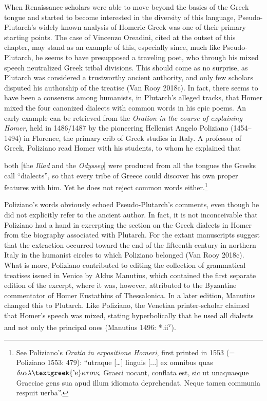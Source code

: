 \begin{styleStandard}
When Renaissance scholars were able to move beyond the basics of the Greek tongue and started to become interested in the diversity of this language, Pseudo-Plutarch’s widely known analysis of Homeric Greek was one of their primary starting points. The case of Vincenzo Oreadini, cited at the outset of this chapter, may stand as an example of this, especially since, much like Pseudo-Plutarch, he seems to have presupposed a traveling poet, who through his mixed speech neutralized Greek tribal divisions. This should come as no surprise, as Plutarch was considered a trustworthy ancient authority, and only few scholars disputed his authorship of the treatise (Van Rooy 2018c). In fact, there seems to have been a consensus among humanists, in Plutarch’s alleged tracks, that Homer mixed the four canonized dialects with common words in his epic poems. An early example can be retrieved from the \textit{Oration in the course of explaining Homer}, held in 1486/1487 by the pioneering Hellenist Angelo Poliziano (1454–1494) in Florence, the primary crib of Greek studies in Italy. A professor of Greek, Poliziano read Homer with his students, to whom he explained that
\end{styleStandard}

\begin{styleQuote}
both [the \textit{Iliad} and the \textit{Odyssey}] were produced from all the tongues the Greeks call “dialects”, so that every tribe of Greece could discover his own proper features with him. Yet he does not reject common words either.\footnote{ See Poliziano’s \textit{Oratio in expositione Homeri}, first printed in 1553 (= Poliziano 1553: 479): “utraque […] linguis [...] ex omnibus quas $\delta \iota \alpha \lambda \text{\textgreek{'e}}\kappa \tau o\upsilon \varsigma $ Graeci uocant, conflata est, sic ut unaquaeque Graeciae gens sua apud illum idiomata deprehendat. Neque tamen communia respuit uerba”.}
\end{styleQuote}

\begin{styleStandard}
Poliziano’s words obviously echoed Pseudo-Plutarch’s comments, even though he did not explicitly refer to the ancient author. In fact, it is not inconceivable that Poliziano had a hand in excerpting the section on the Greek dialects in Homer from the biography associated with Plutarch. For the extant manuscripts suggest that the extraction occurred toward the end of the fifteenth century in northern Italy in the humanist circles to which Poliziano belonged (Van Rooy 2018c). What is more, Poliziano contributed to editing the collection of grammatical treatises issued in Venice by Aldus Manutius, which contained the first separate edition of the excerpt, where it was, however, attributed to the Byzantine commentator of Homer Eustathius of Thessalonica. In a later edition, Manutius changed this to Plutarch. Like Poliziano, the Venetian printer-scholar claimed that Homer’s speech was mixed, stating hyperbolically that he used all dialects and not only the principal ones (Manutius 1496: *.ii\textsc{\textsuperscript{v}}).
\end{styleStandard}

